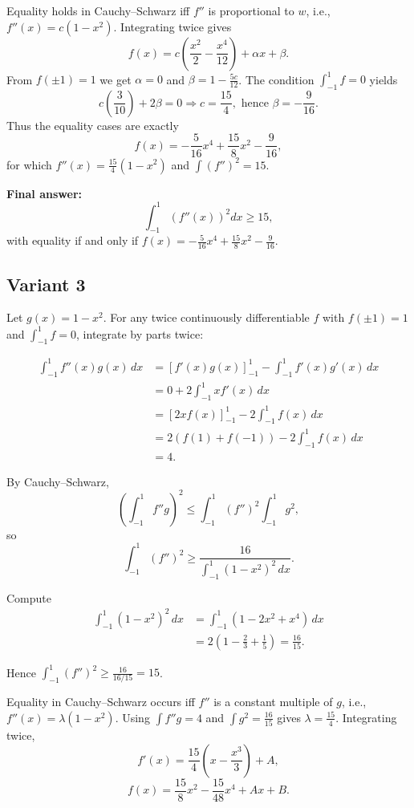 \documentclass[12pt,a4paper]{article}
\theoremstyle{definition}
\begin{document}
    Equality holds in Cauchy--Schwarz iff $f''$ is proportional to $w$, i.e., $f''(x) = c(1 - x^2)$. Integrating twice gives
    $$f(x) = c\left(\frac{x^2}{2} - \frac{x^4}{12}\right) + \alpha x + \beta.$$
    From $f(\pm 1) = 1$ we get $\alpha = 0$ and $\beta = 1 - \frac{5c}{12}$. The condition $\int_{-1}^1 f = 0$ yields
    $$c\left(\frac{3}{10}\right) + 2\beta = 0 \Rightarrow c = \frac{15}{4}, \text{ hence } \beta = -\frac{9}{16}.$$
    Thus the equality cases are exactly
    $$f(x) = -\frac{5}{16} x^4 + \frac{15}{8} x^2 - \frac{9}{16},$$
    for which $f''(x) = \frac{15}{4}(1 - x^2)$ and $\int (f'')^2 = 15$.

    \textbf{Final answer:}
    $$\int_{-1}^{1} (f''(x))^2 dx \geq 15,$$
    with equality if and only if $f(x) = -\frac{5}{16} x^4 + \frac{15}{8} x^2 - \frac{9}{16}$.

    \subsection{Variant 3}
    Let $g(x) = 1 - x^2$. For any twice continuously differentiable $f$ with $f(\pm 1) = 1$ and $\int_{-1}^1 f = 0$, integrate by parts twice:

    \begin{align}
        \int_{-1}^1 f''(x) g(x) \, dx &= [f'(x) g(x)]_{-1}^1 - \int_{-1}^1 f'(x) g'(x) \, dx \\
        &= 0 + 2\int_{-1}^1 x f'(x) \, dx \\
        &= [2x f(x)]_{-1}^1 - 2\int_{-1}^1 f(x) \, dx \\
        &= 2(f(1) + f(-1)) - 2\int_{-1}^1 f(x) \, dx \\
        &= 4.
    \end{align}

    By Cauchy–Schwarz,
    $$\left(\int_{-1}^1 f'' g\right)^2 \leq \int_{-1}^1 (f'')^2 \int_{-1}^1 g^2,$$
    so
    $$\int_{-1}^1 (f'')^2 \geq \frac{16}{\int_{-1}^1 (1 - x^2)^2 \, dx}.$$

    Compute
    \begin{align}
        \int_{-1}^1 (1 - x^2)^2 \, dx &= \int_{-1}^1 (1 - 2x^2 + x^4) \, dx \\
        &= 2\left(1 - \frac{2}{3} + \frac{1}{5}\right) = \frac{16}{15}.
    \end{align}

    Hence $\int_{-1}^1 (f'')^2 \geq \frac{16}{16/15} = 15$.

    Equality in Cauchy–Schwarz occurs iff $f''$ is a constant multiple of $g$, i.e., $f''(x) = \lambda(1 - x^2)$. Using $\int f'' g = 4$ and $\int g^2 = \frac{16}{15}$ gives $\lambda = \frac{15}{4}$. Integrating twice,
    $$f'(x) = \frac{15}{4}\left(x - \frac{x^3}{3}\right) + A,$$
    $$f(x) = \frac{15}{8}x^2 - \frac{15}{48}x^4 + A x + B.$$
\end{document}
